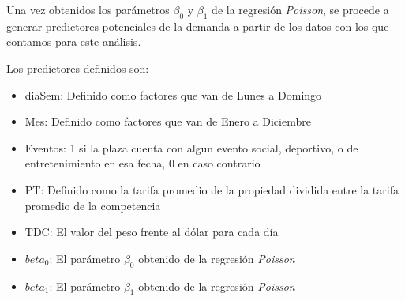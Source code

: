 Una vez obtenidos los parámetros $\beta_0$ y $\beta_1$ de la regresión \emph{Poisson}, se procede a generar predictores potenciales de la demanda a partir de los datos con los que contamos para este análisis.

Los predictores definidos son:

\begin{itemize}
  \item diaSem: Definido como factores que van de Lunes a Domingo
  \item Mes: Definido como factores que van de Enero a Diciembre
  \item Eventos: 1 si la plaza cuenta con algun evento social, deportivo, o de entretenimiento en esa fecha, 0 en caso contrario
  \item PT: Definido como la tarifa promedio de la propiedad dividida entre la tarifa promedio de la competencia
  \item TDC: El valor del peso frente al dólar para cada día
  \item $beta_0$: El parámetro $\beta_0$ obtenido de la regresión \emph{Poisson}
  \item $beta_1$: El parámetro $\beta_1$ obtenido de la regresión \emph{Poisson}
\end{itemize}





